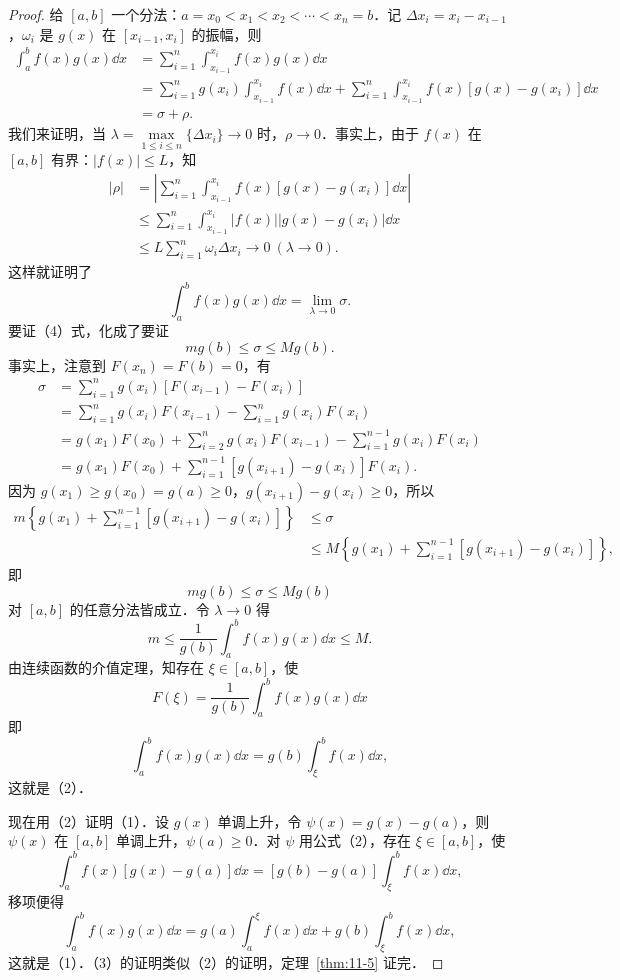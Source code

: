 \begin{proof}
给 $[a,b]$ 一个分法：$a=x_{0}<x_{1}<x_{2}<\cdots<x_{n}=b$．记 $\Delta x_{i}=x_{i}-x_{i-1}$，$\omega_{i}$ 是 $g(x)$ 在 $[x_{i-1},x_{i}]$ 的振幅，则
\[
\begin{aligned}
\int_{a}^{b}f(x)g(x)\dd x&=\sum_{i=1}^{n}\int_{x_{i-1}}^{x_{i}}f(x)g(x)\dd x\\
&=\sum_{i=1}^{n}g(x_{i})\int_{x_{i-1}}^{x_{i}}f(x)\dd x+\sum_{i=1}^{n}\int_{x_{i-1}}^{x_{i}}f(x)\left[g(x)-g(x_{i})\right]\dd x\\
&=\sigma+\rho.
\end{aligned}
\]
我们来证明，当 $\lambda=\max\limits_{1\leqslant i\leqslant n}\{\Delta x_{i}\}\to 0$ 时，$\rho\to 0$．事实上，由于 $f(x)$ 在 $[a,b]$ 有界：$\left|f(x)\right|\leqslant L$，知
\[
\begin{aligned}
\left|\rho\right|&=\left|\sum_{i=1}^{n}\int_{x_{i-1}}^{x_{i}}f(x)\left[g(x)-g(x_{i})\right]\dd x\right|\\
&\leqslant\sum_{i=1}^{n}\int_{x_{i-1}}^{x_{i}}\left|f(x)\right|\left|g(x)-g(x_{i})\right|\dd x\\
&\leqslant L\sum_{i=1}^{n}\omega_{i}\Delta x_{i}\to 0\ (\lambda\to 0).
\end{aligned}
\]
这样就证明了
\[
\int_{a}^{b}f(x)g(x)\dd x=\lim_{\lambda\to 0}\sigma.
\]
要证（4）式，化成了要证
\[
mg(b)\leqslant\sigma\leqslant Mg(b).
\]
事实上，注意到 $F(x_{n})=F(b)=0$，有
\[
\begin{aligned}
\sigma&=\sum_{i=1}^{n}g(x_{i})\left[F(x_{i-1})-F(x_{i})\right]\\
&=\sum_{i=1}^{n}g(x_{i})F(x_{i-1})-\sum_{i=1}^{n}g(x_{i})F(x_{i})\\
&=g(x_{1})F(x_{0})+\sum_{i=2}^{n}g(x_{i})F(x_{i-1})-\sum_{i=1}^{n-1}g(x_{i})F(x_{i})\\
&=g(x_{1})F(x_{0})+\sum_{i=1}^{n-1}\left[g(x_{i+1})-g(x_{i})\right]F(x_{i}).
\end{aligned}
\]
因为 $g(x_{1})\geqslant g(x_{0})=g(a)\geqslant 0$，$g(x_{i+1})-g(x_{i})\geqslant 0$，所以
\[
\begin{aligned}
m\left\{g(x_{1})+\sum_{i=1}^{n-1}\left[g(x_{i+1})-g(x_{i})\right]\right\}&\leqslant\sigma\\
&\leqslant M\left\{g(x_{1})+\sum_{i=1}^{n-1}\left[g(x_{i+1})-g(x_{i})\right]\right\},
\end{aligned}
\]
即
\[
mg(b)\leqslant\sigma\leqslant Mg(b)
\]
对 $[a,b]$ 的任意分法皆成立．令 $\lambda\to 0$ 得
\[
m\leqslant\frac{1}{g(b)}\int_{a}^{b}f(x)g(x)\dd x\leqslant M.
\]
由连续函数的介值定理，知存在 $\xi\in[a,b]$，使
\[
F(\xi)=\frac{1}{g(b)}\int_{a}^{b}f(x)g(x)\dd x
\]
即
\[
\int_{a}^{b}f(x)g(x)\dd x=g(b)\int_{\xi}^{b}f(x)\dd x,
\]
这就是（2）．

现在用（2）证明（1）．设 $g(x)$ 单调上升，令 $\psi(x)=g(x)-g(a)$，则 $\psi(x)$ 在 $[a,b]$ 单调上升，$\psi(a)\geqslant 0$．对 $\psi$ 用公式（2），存在 $\xi\in[a,b]$，使
\[
\int_{a}^{b}f(x)\left[g(x)-g(a)\right]\dd x=\left[g(b)-g(a)\right]\int_{\xi}^{b}f(x)\dd x,
\]
移项便得
\[
\int_{a}^{b}f(x)g(x)\dd x=g(a)\int_{a}^{\xi}f(x)\dd x+g(b)\int_{\xi}^{b}f(x)\dd x,
\]
这就是（1）．（3）的证明类似（2）的证明，定理~\ref{thm:11-5} 证完．
\end{proof}

